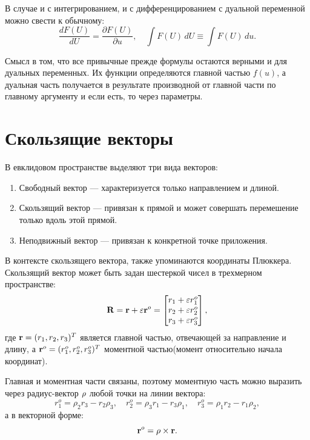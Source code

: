 В случае и с интегрированием, и с дифференцированием с дуальной переменной можно свести к обычному:
\begin{equation*}
    \frac{dF(U)}{dU} = \frac{\partial F(U)}{\partial u}, \quad \int F(U) \, dU \equiv \int F(U) \, du.
\end{equation*}

Смысл в том, что все привычные прежде формулы остаются верными и для дуальных переменных. Их функции определяются главной частью $f(u)$, а дуальная часть получается в результате производной от главной части по главному аргументу и если есть, то через параметры.

\section{Скользящие векторы}

В евклидовом пространстве выделяют три вида векторов:
\begin{enumerate}
    \item Свободный вектор --- характеризуется только направлением и длиной.
    \item Скользящий вектор --- привязан к прямой и может совершать перемешение только вдоль этой прямой.
    \item Неподвижный вектор --- привязан к конкретной точке приложения.
\end{enumerate}

В контексте скользящего вектора, также упоминаются координаты Плюккера. Скользящий вектор может быть задан шестеркой чисел в трехмерном пространстве:
\begin{equation*}
    \vb{R} = \vb{r} + \varepsilon \vb{r}^o = \begin{bmatrix} r_1 + \varepsilon r_1^o \\ r_2 + \varepsilon r_2^o \\ r_3 + \varepsilon r_3^o \end{bmatrix},
\end{equation*}
где $\vb{r} = (r_1, r_2, r_3)^T$ является главной частью, отвечающей за направление и длину, а $\vb{r}^o = (r_1^o, r_2^o, r_3^o)^T$ моментной частью(момент относительно начала координат).

Главная и моментная части связаны, поэтому моментную часть можно выразить через радиус-вектор $\vb{\rho}$ любой точки на линии вектора:
\begin{equation*}
    r_1^o = \rho_2 r_3 - r_2 \rho_3, \quad r_2^o = \rho_3 r_1 - r_3 \rho_1, \quad r_3^o = \rho_1 r_2 - r_1 \rho_2,
\end{equation*}
а в векторной форме:
\begin{equation*}
    \vb{r}^o = \vb{\rho} \times \vb{r}.
\end{equation*}

